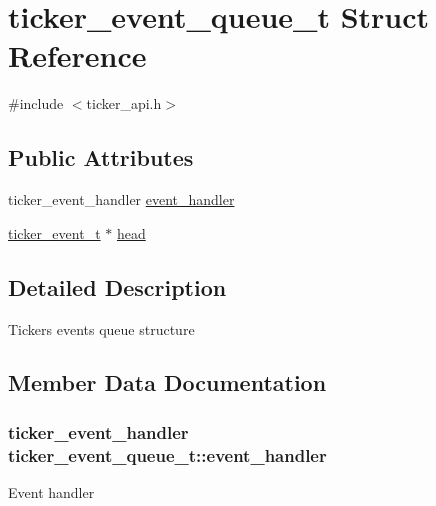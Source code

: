 \hypertarget{structticker__event__queue__t}{}\section{ticker\+\_\+event\+\_\+queue\+\_\+t Struct Reference}
\label{structticker__event__queue__t}


{\ttfamily \#include $<$ticker\+\_\+api.\+h$>$}

\subsection*{Public Attributes}
\begin{DoxyCompactItemize}
\item 
ticker\+\_\+event\+\_\+handler \hyperlink{structticker__event__queue__t_a3b534d67eddbdc485e73d23a8b84c464}{event\+\_\+handler}
\item 
\hyperlink{structticker__event__s}{ticker\+\_\+event\+\_\+t} $\ast$ \hyperlink{structticker__event__queue__t_a82f921674b4b3f8a5315f26200a9db11}{head}
\end{DoxyCompactItemize}


\subsection{Detailed Description}
Tickers events queue structure 

\subsection{Member Data Documentation}
\subsubsection[{\texorpdfstring{event\+\_\+handler}{event_handler}}]{\setlength{\rightskip}{0pt plus 5cm}ticker\+\_\+event\+\_\+handler ticker\+\_\+event\+\_\+queue\+\_\+t\+::event\+\_\+handler}\hypertarget{structticker__event__queue__t_a3b534d67eddbdc485e73d23a8b84c464}{}\label{structticker__event__queue__t_a3b534d67eddbdc485e73d23a8b84c464}
Event handler 
